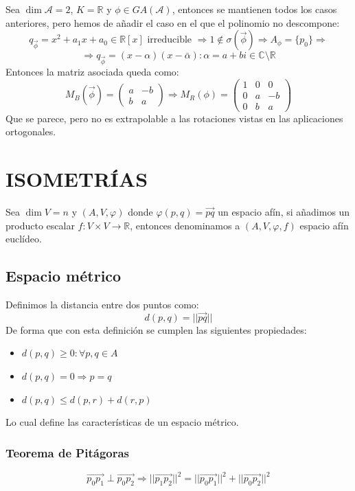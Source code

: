 \documentclass[10pt,a4paper,openright]{book}
\theoremstyle{break}
\begin{document}
Sea $\dim \mathcal{A} = 2$, $K = \mathbb{R}$ y $\phi \in GA(\mathcal{A})$, entonces se mantienen todos los casos anteriores, pero hemos de añadir el caso en el que el polinomio no descompone:
$$q_{\vec{\phi}} = x^2 + a_1x + a_0 \in \mathbb{R}[x] \mbox{ irreducible } \Rightarrow 1 \notin \sigma(\vec{\phi}) \Rightarrow A_\phi = \{p_0\} \Rightarrow$$
$$ \Rightarrow q_{\vec{\phi}} = (x- \alpha)(x - \bar{\alpha}) : \alpha = a + bi \in \mathbb{C} \setminus \mathbb{R}$$
Entonces la matriz asociada queda como:
$$M_B (\vec{\phi}) = \begin{pmatrix}
a & -b \\ b & a
\end{pmatrix}\Rightarrow M_R (\phi) =  \left(\begin{array}{c|cc}
1  & 0 & 0 \\
\hline
0 & a &  -b \\
0 & b &  a
\end{array}
\right)$$
Que se parece, pero no es extrapolable a las rotaciones vistas en las aplicaciones ortogonales.

\section{ISOMETRÍAS}
Sea $\dim V = n$ y $(A, V, \varphi)$ donde $\varphi(p,q) = \vec{pq}$ un espacio afín, si añadimos un producto escalar $f: V \times V \rightarrow \mathbb R$, entonces denominamos a $(A,V,\varphi, f)$ espacio afín euclídeo.

\subsection{Espacio métrico}
Definimos la distancia entre dos puntos como:
$$d(p,q) = ||\vec{pq}||$$
De forma que con esta definición se cumplen las siguientes propiedades:
\begin{itemize}
\item $d(p,q) \geq 0 : \forall p,q\in A$
\item $d(p,q) = 0\Rightarrow p = q$
\item $d(p,q) \leq d(p,r) + d(r,p)$
\end{itemize}
Lo cual define las características de un espacio métrico.

\subsubsection*{Teorema de Pitágoras}
$$\vec{p_0p_1}\perp \vec{p_0p_2}\Rightarrow ||\vec{p_1p_2}||^2 = ||\vec{p_0p_1}||^2 + ||\vec{p_0p_2}||^2$$
\end{document}

